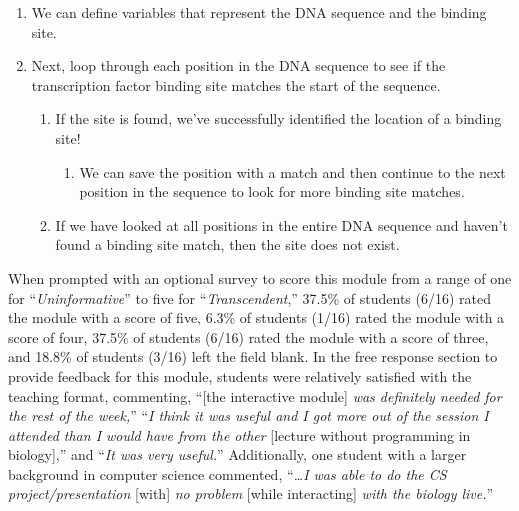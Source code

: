 \begin{enumerate}
\begin{enumerate}
        \item We can define variables that represent the DNA sequence and the binding site. 
        \item Next, loop through each position in the DNA sequence to see if the transcription factor binding site matches the start of the sequence. 
        \begin{enumerate}
            \item If the site is found, we’ve successfully identified the location of a binding site! 
            \begin{enumerate}
                \item We can save the position with a match and then continue to the next position in the sequence to look for more binding site matches. 
            \end{enumerate}
            \item If we have looked at all positions in the entire DNA sequence and haven’t found a binding site match, then the site does not exist. 
        \end{enumerate}
    \end{enumerate}
\end{enumerate}

\par\noindent\dotfill

When prompted with an optional survey to score this module from a range of one for “\textit{Uninformative}” to five for “\textit{Transcendent},” 37.5\% of students (6/16) rated the module with a score of five, 6.3\% of students (1/16) rated the module with a score of four, 37.5\% of students (6/16) rated the module with a score of three, and 18.8\% of students (3/16) left the field blank. In the free response section to provide feedback for this module, students were relatively satisfied with the teaching format, commenting, “[the interactive module] \textit{was definitely needed for the rest of the week,}” “\textit{I think it was useful and I got more out of the session I attended than I would have from the other} [lecture without programming in biology],” and “\textit{It was very useful.}” Additionally, one student with a larger background in computer science commented, “\textit{…I was able to do the CS project/presentation} [with] \textit{no problem} [while interacting] \textit{with the biology live.}” 

